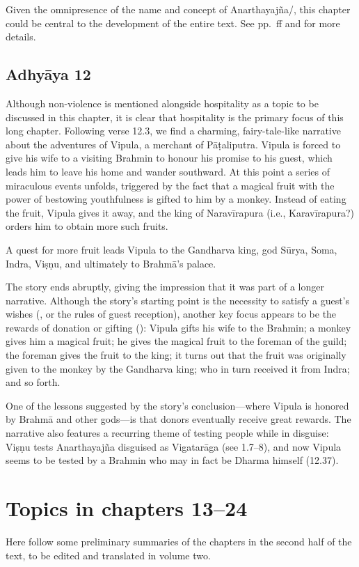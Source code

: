 Given the omnipresence of the name and concept of Anarthayajña/, 
this chapter could be central to the development of the entire text. 
See pp.~\pageref{nonmaterial}ff and  for more details.
 

\subsection*{Adhyāya 12}\label{contents_of_ch12}
Although non-violence is mentioned alongside hospitality as a
topic to be discussed in this chapter, it is clear that hospitality 
is the primary focus of this long chapter.
Following verse 12.3, we find a charming, fairy-tale-like narrative
about the adventures of Vipula, a merchant of Pāṭaliputra. 
Vipula is forced to give his wife to a visiting 
Brahmin to honour his promise to his guest, 
which leads him to leave his home and wander southward.
At this point a series of miraculous events unfolds,
triggered by the fact that a magical fruit with the power of bestowing 
youthfulness is gifted to him by a monkey. Instead of eating the fruit,
Vipula gives it away, and the king of Naravīrapura (i.e., Karavīrapura?)
orders him to obtain more such fruits. 

A quest for more fruit leads Vipula to the Gandharva king, god Sūrya, Soma, Indra, Viṣṇu, and
ultimately to Brahmā's palace.

The story ends abruptly, giving the impression that it was
part of a longer narrative. Although the story's starting point
is the necessity to satisfy a guest's wishes (, or 
the rules of guest reception), another key focus appears to 
be the rewards of donation or gifting (): Vipula gifts his wife to the Brahmin;
a monkey gives him a magical fruit; he gives the magical fruit to the foreman of the guild;
the foreman gives the fruit to the king; 
it turns out that the fruit was originally given to the monkey by the Gandharva king; 
who in turn received it from Indra; and so forth. 
    
One of the lessons suggested by the story’s conclusion---where
Vipula is honored by Brahmā and other gods---is
that donors eventually receive great rewards. 
The narrative also features a recurring theme of testing people while in disguise: 
Viṣṇu tests Anarthayajña disguised as Vigatarāga (see 1.7–8), 
and now Vipula seems to be tested by a Brahmin who may in fact be Dharma himself (12.37).

\section{Topics in chapters 13--24}\label{contentsof12_24}
Here follow some preliminary summaries of the chapters in the second half of the text, to be edited and translated in volume two.

